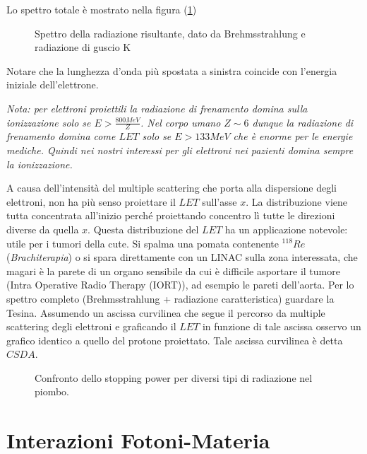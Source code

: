 Lo spettro totale è mostrato nella figura (\ref{brehmspect})

\begin{figure}
\centering
		\caption{Spettro della radiazione risultante, dato da Brehmsstrahlung e radiazione di guscio K}
         \label{brehmspect}
\end{figure}

Notare che la lunghezza d'onda più spostata a sinistra coincide con l'energia iniziale dell'elettrone.

\emph{Nota: per elettroni proiettili la radiazione di frenamento domina sulla ionizzazione solo se $E>\frac{800 MeV}{Z}$. Nel corpo umano $Z\sim6$ dunque la radiazione di frenamento domina come $LET$ solo se $E>133 MeV$ che è enorme per le energie mediche. Quindi nei nostri interessi per gli elettroni nei pazienti domina sempre la ionizzazione.}

A causa dell'intensità del multiple scattering che porta alla dispersione degli elettroni, non ha più senso proiettare il $LET$ sull'asse $x$. La distribuzione viene tutta concentrata all'inizio perché proiettando concentro lì tutte le direzioni diverse da quella $x$.
Questa distribuzione del $LET$ ha un applicazione notevole: utile per i tumori della cute. Si spalma una pomata contenente $^{118}Re$ (\emph{Brachiterapia}\cite{Brachioterapia}) o si spara direttamente con un LINAC sulla zona interessata, che magari è la parete di un organo sensibile da cui è difficile asportare il tumore (Intra Operative Radio Therapy (IORT)\cite{Intraoperative_probes}), ad esempio le pareti dell'aorta.
Per lo spettro completo (Brehmsstrahlung + radiazione caratteristica) guardare la Tesina.
Assumendo un ascissa curvilinea che segue il percorso da multiple scattering degli elettroni e graficando il $LET$ in funzione di tale ascissa osservo un grafico identico a quello del protone proiettato. Tale ascissa curvilinea è detta $CSDA$.

\begin{figure}
\centering
		\caption{Confronto dello stopping power per diversi tipi di radiazione nel piombo.}
         \label{stoppingpower}
\end{figure}


\section{Interazioni Fotoni-Materia}


